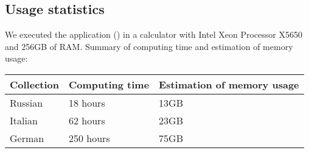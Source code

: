     \subsection{Usage statistics}
        We executed the application () in a calculator with Intel\textsuperscript{\textregistered} Xeon\textsuperscript{\textregistered} Processor X5650 and 256GB of RAM. Summary of computing time and estimation of memory usage:
        \begin{center}
			\begin{tabular}[H]{| p{} | p{} | p{} |}
                \hline
                Collection  & Computing time    & Estimation of memory usage \\ \hline\hline
				Russian     & 18 hours          & 13GB                       \\ \hline
                Italian     & 62 hours          & 23GB                       \\ \hline
                German      & 250 hours         & 75GB                       \\ \hline %
			\end{tabular}
        \end{center}